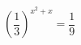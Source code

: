 \begin{ex}
	\begin{condition}
		\( \left( \dfrac{1}{3} \right)^{x^2+x}=\dfrac{1}{9} \)
	\end{condition}
\end{ex}